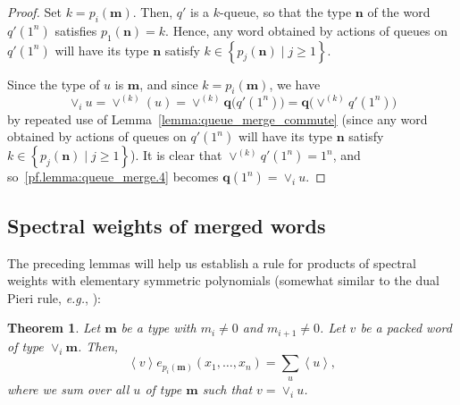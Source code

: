 \documentclass[reqno]{amsart}
\newcommand{\0}{\phantom{c}}
\newcommand{\swt}[1]{\left\langle #1 \right\rangle} %
\newcommand{\merge}[1]{\vee_{#1}} %
\newcommand{\mm}{\mathbf{m}}
\newcommand{\nn}{\mathbf{n}}
\newcommand{\qq}{\mathbf{q}}
\let\sumnonlimits\sum
\renewcommand{\sum}{\sumnonlimits\limits}
\newcommand{\set}[1]{\left\{ #1 \right\}}
\theoremstyle{plain}
\newtheorem{thm}{Theorem}[section]
\theoremstyle{definition}
\numberwithin{equation}{section}
\begin{document}
\begin{proof}
Set $k = p_i(\mm)$. Then, $q'$ is a $k$-queue, so that the type
$\nn$ of the word $q'(1^n)$ satisfies $p_1(\nn) = k$.
Hence, any word obtained by actions of queues on $q'(1^n)$
will have its type $\nn$ satisfy
$k \in \set{ p_j(\nn) \mid j \geq 1 } $.

Since the type of $u$ is $\mm$, and since $k = p_i(\mm)$, we have
\begin{equation}
\label{pf.lemma:queue_merge.4}
 \merge{i} u = \vee^{(k)} (u) = \vee^{(k)} \qq\bigl( q' (1^n) \bigr) = \qq\bigl( \vee^{(k)} q' (1^n) \bigr)
\end{equation}
by repeated use of Lemma~\ref{lemma:queue_merge_commute}
(since any word obtained by actions of queues on $q'(1^n)$
will have its type $\nn$ satisfy
$k \in \set{ p_j(\nn) \mid j \geq 1 } $).
It is clear that $\vee^{(k)} q'(1^n) = 1^n$,
and so~\eqref{pf.lemma:queue_merge.4} becomes $\qq(1^n) = \merge{i} u$.
\end{proof}

\subsection{Spectral weights of merged words}

The preceding lemmas will help us establish a rule for products of spectral weights with elementary symmetric polynomials (somewhat similar to the dual Pieri rule, \textit{e.g.}, \cite[Section 7.15]{Stanley-EC2}):

\begin{thm}
\label{thm:merge}
  Let $\mm$ be a type with $m_i \neq 0$ and $m_{i+1} \neq 0$.
  Let $v$ be a packed word of type $\merge{i}\mm$.
  Then,
  \[
  \swt{v} e_{p_i(\mm)}(x_1, \dotsc, x_n) = \sum_u \swt{u},
  \]
where we sum over all $u$ of type $\mm$ such that $v = \merge{i} u$.
\end{thm}
\end{document}
